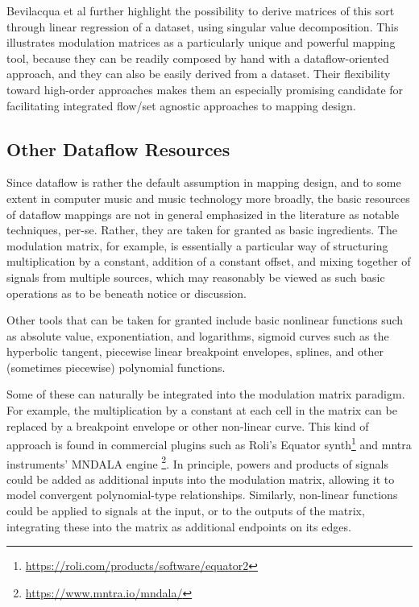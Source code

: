 \documentclass[main.tex]{subfiles}
\begin{document}
Bevilacqua et al \cite{bevilacqua2005nime_mnm} further highlight the possibility to derive matrices of this sort
through linear regression of a dataset, using singular value decomposition. This illustrates modulation matrices
as a particularly unique and powerful mapping tool, because they can be readily composed by hand with a
dataflow-oriented approach, and they can also be easily derived from a dataset. Their flexibility toward
high-order approaches makes them an especially promising candidate for facilitating integrated
flow/set agnostic approaches to mapping design.

\subsection{Other Dataflow Resources}

Since dataflow is rather the default assumption in mapping design, and to some extent in computer
music and music technology more broadly, the basic resources of dataflow mappings are not in general
emphasized in the literature as notable techniques, per-se. Rather, they are taken for granted as
basic ingredients. The modulation matrix, for example, is essentially a particular way of structuring
multiplication by a constant, addition of a constant offset, and mixing together of signals from multiple sources,
which may reasonably be viewed as such basic operations as to be beneath notice or discussion.

Other tools that can be taken for granted include basic nonlinear functions such as absolute value, exponentiation, and
logarithms, sigmoid curves such as the hyperbolic tangent, piecewise linear breakpoint envelopes, splines,
and other (sometimes piecewise) polynomial functions.

Some of these can naturally be integrated into the modulation matrix paradigm. For example, the multiplication
by a constant at each cell in the matrix can be replaced by a breakpoint envelope or other non-linear curve.
This kind of approach is found in commercial plugins such as Roli's Equator synth\footnote{\url{https://roli.com/products/software/equator2}} and mntra instruments' MNDALA engine \footnote{\url{https://www.mntra.io/mndala/}}. In principle, powers and products
of signals could be added as additional inputs into the modulation matrix, allowing it to model convergent
polynomial-type relationships. Similarly, non-linear functions could be applied to signals at the input, or
to the outputs of the matrix, integrating these into the matrix as additional endpoints on its edges.
\end{document}
